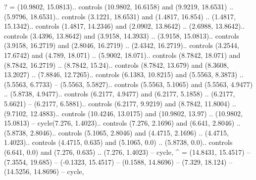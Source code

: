 {?} = {(10.9802, 15.0813).. controls (10.9802, 16.6158) and (9.9219, 18.6531) .. (5.9796, 18.6531).. controls (3.1221, 18.6531) and (1.4817, 16.854) .. (1.4817, 15.1342).. controls (1.4817, 14.2346) and (2.0902, 13.8642) .. (2.6988, 13.8642).. controls (3.4396, 13.8642) and (3.9158, 14.3933) .. (3.9158, 15.0813).. controls (3.9158, 16.2719) and (2.8046, 16.2719) .. (2.4342, 16.2719).. controls (3.2544, 17.6742) and (4.789, 18.071) .. (5.9002, 18.071).. controls (8.7842, 18.071) and (8.7842, 16.2719) .. (8.7842, 15.24).. controls (8.7842, 13.679) and (8.3608, 13.2027) .. (7.8846, 12.7265).. controls (6.1383, 10.8215) and (5.5563, 8.3873) .. (5.5563, 6.7733) -- (5.5563, 5.5827).. controls (5.5563, 5.1065) and (5.5563, 4.9477) .. (5.8738, 4.9477).. controls (6.2177, 4.9477) and (6.2177, 5.1858) .. (6.2177, 5.6621) -- (6.2177, 6.5881).. controls (6.2177, 9.9219) and (8.7842, 11.8004) .. (9.7102, 12.4883).. controls (10.4246, 13.0175) and (10.9802, 13.97) .. (10.9802, 15.0813) -- cycle(7.276, 1.4023).. controls (7.276, 2.1696) and (6.641, 2.8046) .. (5.8738, 2.8046).. controls (5.1065, 2.8046) and (4.4715, 2.1696) .. (4.4715, 1.4023).. controls (4.4715, 0.635) and (5.1065, 0.0) .. (5.8738, 0.0).. controls (6.641, 0.0) and (7.276, 0.635) .. (7.276, 1.4023) -- cycle},
{^} = {(14.8431, 15.4517) -- (7.3554, 19.685) -- (-0.1323, 15.4517) -- (0.1588, 14.8696) -- (7.329, 18.124) -- (14.5256, 14.8696) -- cycle},
